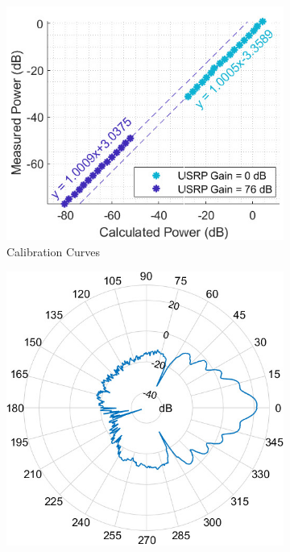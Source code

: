 \documentclass[10pt, twocolumn]{IEEEtran}
\begin{document}
\begin{figure} [t]
     \centering
     \begin{subfigure}{0.365\linewidth}
         \centering
         \includegraphics[width=1.0\linewidth]{figs/calibration.jpg}
         \caption{Calibration Curves}
     \end{subfigure}
     \begin{subfigure}{0.310\linewidth}
         \centering
         \includegraphics[width=1.0\linewidth]{figs/antenna_azimuth.jpg}

\end{subfigure}
\end{figure}
\end{document}
